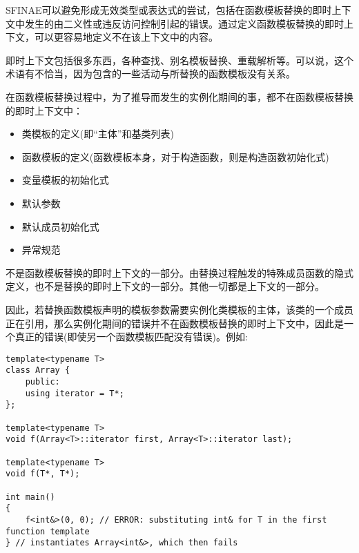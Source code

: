 
SFINAE可以避免形成无效类型或表达式的尝试，包括在函数模板替换的即时上下文中发生的由二义性或违反访问控制引起的错误。通过定义函数模板替换的即时上下文，可以更容易地定义不在该上下文中的内容。

\begin{tcolorbox}[colback=webgreen!5!white,colframe=webgreen!75!black]
\hspace*{0.75cm}即时上下文包括很多东西，各种查找、别名模板替换、重载解析等。可以说，这个术语有不恰当，因为包含的一些活动与所替换的函数模板没有关系。
\end{tcolorbox}

在函数模板替换过程中，为了推导而发生的实例化期间的事，都不在函数模板替换的即时上下文中：

\begin{itemize}
\item 
类模板的定义(即“主体”和基类列表)

\item 
函数模板的定义(函数模板本身，对于构造函数，则是构造函数初始化式)

\item 
变量模板的初始化式

\item 
默认参数

\item 
默认成员初始化式

\item 
异常规范
\end{itemize}

不是函数模板替换的即时上下文的一部分。由替换过程触发的特殊成员函数的隐式定义，也不是替换的即时上下文的一部分。其他一切都是上下文的一部分。

因此，若替换函数模板声明的模板参数需要实例化类模板的主体，该类的一个成员正在引用，那么实例化期间的错误并不在函数模板替换的即时上下文中，因此是一个真正的错误(即使另一个函数模板匹配没有错误)。例如:

\begin{lstlisting}[style=styleCXX]
template<typename T>
class Array {
	public:
	using iterator = T*;
};

template<typename T>
void f(Array<T>::iterator first, Array<T>::iterator last);

template<typename T>
void f(T*, T*);

int main()
{
	f<int&>(0, 0); // ERROR: substituting int& for T in the first function template
} // instantiates Array<int&>, which then fails
\end{lstlisting}

